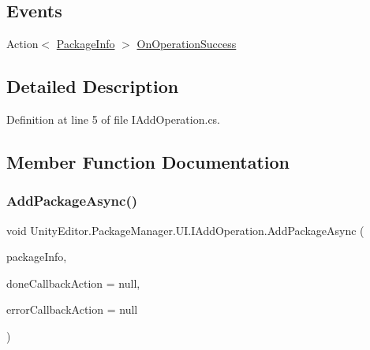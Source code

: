 \subsection*{Events}
\begin{DoxyCompactItemize}
\item 
Action$<$ \mbox{\hyperlink{class_unity_editor_1_1_package_manager_1_1_u_i_1_1_package_info}{Package\+Info}} $>$ \mbox{\hyperlink{interface_unity_editor_1_1_package_manager_1_1_u_i_1_1_i_add_operation_a3ccee2fcd46de2afe67149e2d82e6705}{On\+Operation\+Success}}
\end{DoxyCompactItemize}


\subsection{Detailed Description}


Definition at line 5 of file I\+Add\+Operation.\+cs.



\subsection{Member Function Documentation}
\mbox{\label{interface_unity_editor_1_1_package_manager_1_1_u_i_1_1_i_add_operation_aa242e0ad5710496afa857315b7f82e2c}} 
\subsubsection{\texorpdfstring{AddPackageAsync()}{AddPackageAsync()}}
{\footnotesize\ttfamily void Unity\+Editor.\+Package\+Manager.\+U\+I.\+I\+Add\+Operation.\+Add\+Package\+Async (\begin{DoxyParamCaption}\item[{\mbox{\hyperlink{class_unity_editor_1_1_package_manager_1_1_u_i_1_1_package_info}{Package\+Info}}}]{package\+Info,  }\item[{Action$<$ \mbox{\hyperlink{class_unity_editor_1_1_package_manager_1_1_u_i_1_1_package_info}{Package\+Info}} $>$}]{done\+Callback\+Action = {\ttfamily null},  }\item[{Action$<$ \mbox{\hyperlink{namespace_unity_editor_1_1_package_manager_1_1_u_i_ab1815eb3e48074893d9dc1dc99a4a32aa902b0d55fddef6f8d651fe1035b7d4bd}{Error}} $>$}]{error\+Callback\+Action = {\ttfamily null} }\end{DoxyParamCaption})}



